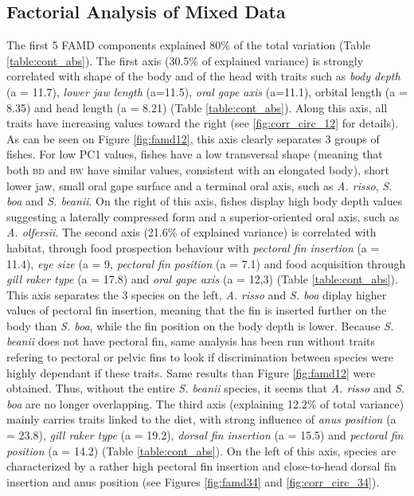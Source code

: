 
\subsection{Factorial Analysis of Mixed Data}

The first 5 FAMD components explained 80\% of the total variation (Table \ref{table:cont_abs}). The first axis (30.5\% of explained variance) is strongly correlated with shape of the body and of the head with traits such as \emph{body depth} (a = 11.7), \emph{lower jaw length} (a=11.5), \emph{oral gape axis} (a=11.1), orbital length (a = 8.35) and head length (a = 8.21) (Table \ref{table:cont_abs}). Along this axis, all traits have increasing values toward the right (see \ref{fig:corr_circ_12} for details). As can be seen on Figure \ref{fig:famd12}, this axis clearly separates 3 groups of fishes. For low PC1 values, fishes have a low transversal shape (meaning that both \textsc{bd} and \textsc{bw} have similar values, consistent with an elongated body), short lower jaw, small oral gape surface and a terminal oral axis, such as \textit{A. risso}, \textit{S. boa} and \textit{S. beanii}. On the right of this axis, fishes display high body depth values suggesting a laterally compressed form and a superior-oriented oral axis, such as \textit{A. olfersii}. 
The second axis (21.6\% of explained variance) is correlated with habitat, through food prospection behaviour with \emph{pectoral fin insertion} (a = 11.4), \emph{eye size} (a = 9, \emph{pectoral fin position} (a = 7.1) and food acquisition through \emph{gill raker type} (a = 17.8) and \emph{oral gape axis} (a = 12,3) (Table \ref{table:cont_abs}). This axis separates the 3 species on the left, \textit{A. risso} and \textit{S. boa} diplay higher values of pectoral fin insertion, meaning that the fin is inserted further on the body than \textit{S. boa}, while the fin position on the body depth is lower. Because \textit{S. beanii} does not have pectoral fin, same analysis has been run without traits refering to pectoral or pelvic fins to look if discrimination between species were highly dependant if these traits. Same results than Figure \ref{fig:famd12} were obtained. Thus, without the entire \textit{S. beanii} species, it seems that \textit{A. risso} and \textit{S. boa} are no longer overlapping. 
The third axis (explaining 12.2\% of total variance) mainly carries traits linked to the diet, with strong influence of \emph{anus position} (a = 23.8), \emph{gill raker type} (a = 19.2), \emph{dorsal fin insertion} (a = 15.5) and \emph{pectoral fin position} (a = 14.2) (Table \ref{table:cont_abs}). On the left of this axis, species are characterized by a rather high pectoral fin insertion and close-to-head dorsal fin insertion and anus position (see Figures \ref{fig:famd34} and \ref{fig:corr_circ_34}).
